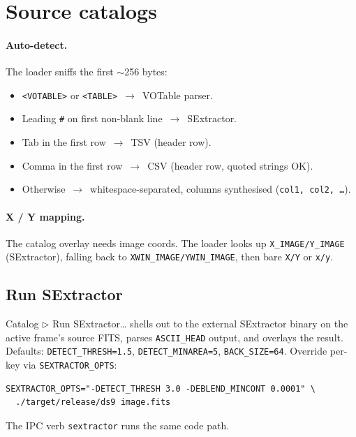 \documentclass[11pt,a4paper]{article}
\begin{document}
\section{Source catalogs}

\paragraph{Auto-detect.} The loader sniffs the first $\sim$256 bytes:

\begin{itemize}
\item \texttt{<VOTABLE>} or \texttt{<TABLE>} \,$\to$\, VOTable parser.
\item Leading \texttt{\#} on first non-blank line \,$\to$\, SExtractor.
\item Tab in the first row \,$\to$\, TSV (header row).
\item Comma in the first row \,$\to$\, CSV (header row, quoted strings OK).
\item Otherwise \,$\to$\, whitespace-separated, columns synthesised
      (\texttt{col1, col2, \dots}).
\end{itemize}

\paragraph{X / Y mapping.} The catalog overlay needs image coords. The
loader looks up \texttt{X\_IMAGE/Y\_IMAGE} (SExtractor), falling back to
\texttt{XWIN\_IMAGE/YWIN\_IMAGE}, then bare \texttt{X/Y} or \texttt{x/y}.

\subsection{Run SExtractor}\label{sec:sex}

\textsf{Catalog $\triangleright$ Run SExtractor\dots} shells out to the
external SExtractor binary on the active frame's source FITS, parses
\texttt{ASCII\_HEAD} output, and overlays the result. Defaults:
\texttt{DETECT\_THRESH=1.5}, \texttt{DETECT\_MINAREA=5},
\texttt{BACK\_SIZE=64}. Override per-key via \texttt{SEXTRACTOR\_OPTS}:

\begin{lstlisting}[language=shell]
SEXTRACTOR_OPTS="-DETECT_THRESH 3.0 -DEBLEND_MINCONT 0.0001" \
  ./target/release/ds9 image.fits
\end{lstlisting}

The IPC verb \texttt{sextractor} runs the same code path.
\end{document}

